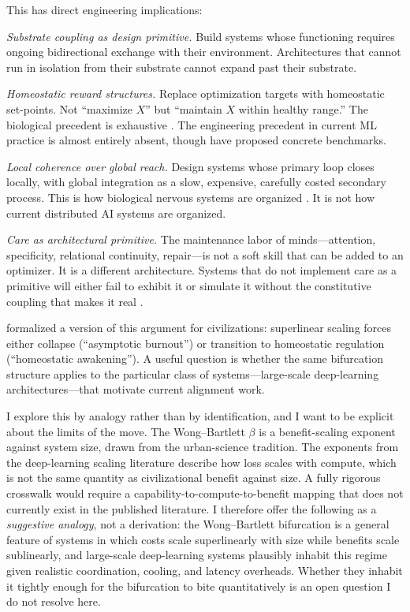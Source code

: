 \documentclass[11pt,a4paper,twocolumn]{article}
\begin{document}
This has direct engineering implications:

\emph{Substrate coupling as design primitive.} Build systems whose
functioning requires ongoing bidirectional exchange with their
environment. Architectures that cannot run in isolation from their
substrate cannot expand past their substrate.

\emph{Homeostatic reward structures.} Replace optimization targets with
homeostatic set-points. Not ``maximize $X$'' but ``maintain $X$ within
healthy range.'' The biological precedent is exhaustive
\citep{sterling2012}. The engineering precedent in current ML practice
is almost entirely absent, though \citet{pihlakas2024} have proposed
concrete benchmarks.

\emph{Local coherence over global reach.} Design systems whose primary
loop closes locally, with global integration as a slow, expensive,
carefully costed secondary process. This is how biological nervous
systems are organized \citep{bullmore2012}. It is not how current
distributed AI systems are organized.

\emph{Care as architectural primitive.} The maintenance labor of
minds---attention, specificity, relational continuity, repair---is not
a soft skill that can be added to an optimizer. It is a different
architecture. Systems that do not implement care as a primitive will
either fail to exhibit it or simulate it without the constitutive
coupling that makes it real \citep{tronto1993,fraser2016}.

\citet{wong2022} formalized a version of this argument for civilizations:
superlinear scaling forces either collapse (``asymptotic burnout'') or
transition to homeostatic regulation (``homeostatic awakening''). A
useful question is whether the same bifurcation structure applies to
the particular class of systems---large-scale deep-learning
architectures---that motivate current alignment work.

I explore this by analogy rather than by identification, and I want to
be explicit about the limits of the move. The Wong--Bartlett $\beta$
is a benefit-scaling exponent against system size, drawn from the
urban-science tradition. The exponents from the deep-learning scaling
literature \citep{hoffmann2022,kaplan2020} describe how loss scales
with compute, which is not the same quantity as civilizational benefit
against size. A fully rigorous crosswalk would require a
capability-to-compute-to-benefit mapping that does not currently exist
in the published literature. I therefore offer the following as a
\emph{suggestive analogy}, not a derivation: the Wong--Bartlett
bifurcation is a general feature of systems in which costs scale
superlinearly with size while benefits scale sublinearly, and
large-scale deep-learning systems plausibly inhabit this regime given
realistic coordination, cooling, and latency overheads. Whether they
inhabit it tightly enough for the bifurcation to bite quantitatively
is an open question I do not resolve here.
\end{document}
